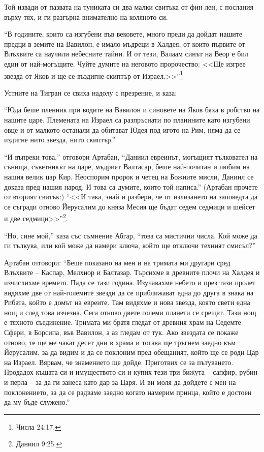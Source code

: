 \documentclass[oneside,10pt]{memoir}
\begin{document}
Той извади от пазвата на туниката си два малки свитъка от фин лен, с послания
върху тях, и ги разгърна внимателно на коляното си.

``В годините, които са изгубени във вековете, много преди да дойдат нашите
предци в земите на Вавилон, е имало мъдреци в Халдея, от които първите от
Влъхвите са научили небесните тайни. И от тези, Валаам синът на Веор е бил един
от най-могъщите. Чуйте думите на неговото пророчество: <<Ще изгрее звезда от
Яков и ще се въздигне скиптър от Израел.>>''\footnote{Числа 24:17.}

Устните на Тигран се свиха надолу с презрение, и каза:

``Юда беше пленник при водите на Вавилон и синовете на Яков бяха в робство на
нашите царе. Племената на Израел са разпръснати по планините като изгубени овце
и от малкото останали да обитават Юдея под игото на Рим, няма да се издигне нито
звезда, нито скиптър.''

``И въпреки това,'' отговори Артабан, ``Даниил евреинът, могъщият тълковател на
сънища, съветникът на царе, мъдрият Валтасар, беше най-почитан и любим на нашия
велик цар Кир. Неоспорим пророк и четец на Божиите мисли, Даниил се доказа пред
нашия народ. И това са думите, които той написа.'' (Артабан прочете от вторият
свитък:) ``<<И така, знай и разбери, че от излизането на заповедта да се съгради
отново Йерусалим до княза Месия ще бъдат седем седмици и шейсет и две
седмици>>''\footnote{Даниил 9:25.}.

``Но, сине мой,'' каза със съмнение Абгар, ``това са мистични числа. Кой може да
ги тълкува, или кой може да намери ключа, който ще отключи техният смисъл?''

Артабан отговори: ``Беше показано на мен и на тримата ми другари сред Влъхвите
-- Каспар, Мелхиор и Балтазар. Търсихме в древните плочи на Халдея и изчислихме
времето. Пада се тази година. Изучавахме небето и през тази пролет видяхме две
от най-големите звезди да се приближават една до друга в знака на Рибата, който
е домът на евреите. Там видяхме и нова звезда, която свети една нощ и след това
изчезна. Сега отново двете големи планети се срещат. Тази нощ е тяхното
съединение. Тримата ми братя гледат от древния храм на Седемте Сфери, в Борсипа,
във Вавилон, а аз гледам от тук. Ако звездата се покаже отново, те ще ме чакат
десет дни в храма и тогава ще тръгнем заедно към Йерусалим, за да видим и да се
поклоним пред обещаният, който ще се роди Цар на Израел. Вярвам, че знамението
ще дойде. Приготвих се за пътуването. Продадох къщата си и имуществото си и
купих тези три бижута -- сапфир, рубин и перла -- за да ги занеса като дар за
Царя. И ви моля да дойдете с мен на поклонението, за да се радваме заедно когато
намерим принца, който е достоен да му бъде служено.''
\end{document}
